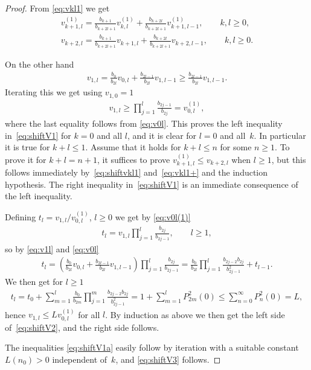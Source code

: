 \documentclass[11pt]{article}
\numberwithin{equation}{section}
\begin{document}
\begin{proof} From \eqref{eq:vkl1} we get
\begin{gather}\label{eq:shiftvkl1}
 v_{k+1,l}^{(1)}=\frac{b_{k+1}}{b_{k+2l+1}}v_{k,l}^{(1)}+ \frac{b_{k+2l}}{b_{k+2l+1}}v_{k+1,l-1}^{(1)},\qquad k,l\ge 0,\\
 \label{eq:vkl1+}
v_{k+2,l}=\frac{b_{k+1}}{b_{k+2l+1}}v_{k+1,l}+ \frac{b_{k+2l}}{b_{k+2l+1}}v_{k+2,l-1},\qquad k,l\ge 0.
\end{gather}

On the other hand
\begin{gather}\label{eq:v1l}
v_{1,l}=\frac{b_0}{b_{2l}} v_{0,l}+\frac{b_{2l-1}}{ b_{2l}}v_{1,l-1}\ge \frac{b_{2l-1}}{ b_{2l}}v_{1,l-1}.
\end{gather}
Iterating this we get using $v_{1,0}=1$
\begin{gather}\label{eq:v0l(1)}
v_{1,l}\ge \prod_{j=1}^l \frac{b_{2j-1}}{b_{2j}}=v_{0,l}^{(1)},
\end{gather}
where the last equality follows from \eqref{eq:v0l}. This proves the left inequality in~\eqref{eq:shiftV1} for $k=0$ and all $l$, and it is clear for $l=0$ and all~$k$. In particular it is true for $k+l\le 1$. Assume that it holds for $k+l\le n$ for some $n\ge 1$. To prove it for $k+l=n+1$, it suffices to prove $v_{k+1,l}^{(1)}\le v_{k+2,l}$ when $l\ge 1$, but this follows immediately by~\eqref{eq:shiftvkl1} and~\eqref{eq:vkl1+} and the induction hypothesis. The right inequality in~\eqref{eq:shiftV1} is an immediate consequence of the left inequality.

Defining $t_l=v_{1,l}/v_{0,l}^{(1)}$, $l\ge 0$ we get by \eqref{eq:v0l(1)}
\begin{gather*}
t_l=v_{1,l}\prod_{j=1}^l \frac{b_{2j}}{b_{2j-1}},\qquad l\ge 1,
\end{gather*}
so by \eqref{eq:v1l} and \eqref{eq:v0l}
\begin{gather*}
t_l=\left(\frac{b_0}{b_{2l}}v_{0,l}+\frac{b_{2l-1}}{b_{2l}}v_{1,l-1}\right)\prod_{j=1}^l \frac{b_{2j}}{b_{2j-1}}=\frac{b_0}{b_{2l}}\prod_{j=1}^l\frac{b_{2j-2}b_{2j}}{b_{2j-1}^2} + t_{l-1}.
\end{gather*}
We then get for $l\ge 1$
\begin{gather*}
t_l=t_0+\sum_{m=1}^l \frac{b_0}{b_{2m}}\prod_{j=1}^m \frac{b_{2j-2}b_{2j}}{b_{2j-1}^2} =1+\sum_{m=1}^l P_{2m}^2(0)\le \sum_{n=0}^\infty P_n^2(0)=L,
\end{gather*}
hence $v_{1,l}\le L v_{0,l}^{(1)}$ for all $l$. By induction as above we then get the left side of~\eqref{eq:shiftV2}, and the right side follows.

The inequalities \eqref{eq:shiftV1a} easily follow by iteration with a suitable constant $L(n_0)>0$ independent of~$k$, and \eqref{eq:shiftV3} follows.
\end{proof}
\end{document}

